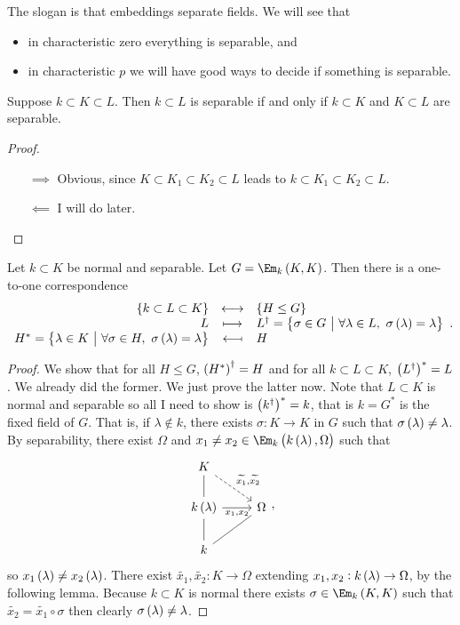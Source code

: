 The slogan is that embeddings separate fields. We will see that
\begin{itemize}
\item in characteristic zero everything is separable, and
\item in characteristic $ p $ we will have good ways to decide if something is separable.
\end{itemize}

\begin{lemma}
Suppose $ k \subset K \subset L $. Then $ k \subset L $ is separable if and only if $ k \subset K $ and $ K \subset L $ are separable.
\end{lemma}

\begin{proof}
\hfill
\begin{itemize}
\item[$ \implies $] Obvious, since $ K \subset K_1 \subset K_2 \subset L $ leads to $ k \subset K_1 \subset K_2 \subset L $.
\item[$ \impliedby $] I will do later.
\end{itemize}
\end{proof}

\begin{theorem}
Let $ k \subset K $ be normal and separable. Let $ G = \Em_k\br{K, K} $. Then there is a one-to-one correspondence
$$ \bijection{\cbr{k \subset L \subset K}}{\cbr{H \le G}}{L}{L^\dagger = \cbr{\sigma \in G \st \forall \lambda \in L, \ \sigma\br{\lambda} = \lambda}}{H^* = \cbr{\lambda \in K \st \forall \sigma \in H, \ \sigma\br{\lambda} = \lambda}}{H}. $$
\end{theorem}

\pagebreak

\begin{proof}
We show that for all $ H \le G $, $ \br{H^*}^\dagger = H $ and for all $ k \subset L \subset K $, $ \br{L^\dagger}^* = L $. We already did the former. We just prove the latter now. Note that $ L \subset K $ is normal and separable so all I need to show is $ \br{k^\dagger}^* = k $, that is $ k = G^* $ is the fixed field of $ G $. That is, if $ \lambda \notin k $, there exists $ \sigma : K \to K $ in $ G $ such that $ \sigma\br{\lambda} \ne \lambda $. By separability, there exist $ \Omega $ and $ x_1 \ne x_2 \in \Em_k\br{k\br{\lambda}, \Omega} $ such that
$$
\begin{tikzcd}
K \arrow[dashed]{dr}{\widetilde{x_1}, \widetilde{x_2}} & \\
k\br{\lambda} \arrow[dash]{u} \arrow[swap]{r}{x_1, x_2} & \Omega \\
k \arrow[dash]{u} \arrow[dash]{ur} &
\end{tikzcd},
$$
so $ x_1\br{\lambda} \ne x_2\br{\lambda} $. There exist $ \widetilde{x_1}, \widetilde{x_2} : K \to \Omega $ extending $ x_1, x_2 : k\br{\lambda} \to \Omega $, by the following lemma. Because $ k \subset K $ is normal there exists $ \sigma \in \Em_k\br{K, K} $ such that $ \widetilde{x_2} = \widetilde{x_1} \circ \sigma $ then clearly $ \sigma\br{\lambda} \ne \lambda $.
\end{proof}

